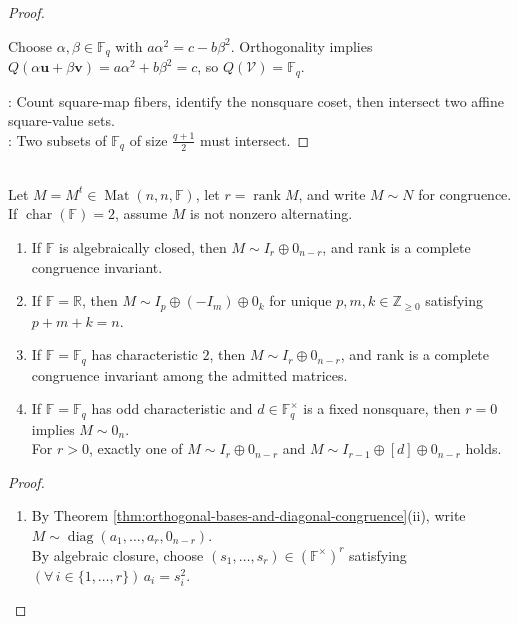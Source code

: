 \begin{proposition}
\begin{proof}
\begin{enumerate}[label=(\roman*)]
Choose $\alpha,\beta\in\mathbb{F}_q$ with $a\alpha^2=c-b\beta^2$. Orthogonality implies $Q(\alpha\mathbf{u}+\beta\mathbf{v})=a\alpha^2+b\beta^2=c$, so $Q(\mathcal{V})=\mathbb{F}_q$.
\end{enumerate}
: Count square-map fibers, identify the nonsquare coset, then intersect two affine square-value sets.\\
: Two subsets of $\mathbb{F}_q$ of size $\frac{q+1}{2}$ must intersect.
\end{proof}
\end{proposition}

\begin{theorem} \label{thm:orthogonal-canonical-forms-common-fields} \\
Let $M=M^t\in\operatorname{Mat}(n,n,\mathbb{F})$, let $r=\operatorname{rank}M$, and write $M\sim N$ for congruence. If $\operatorname{char}(\mathbb{F})=2$, assume $M$ is not nonzero alternating.
\begin{enumerate}[label=(\roman*)]
\setlength{\itemsep}{0pt}
\item If $\mathbb{F}$ is algebraically closed, then $M\sim I_r\oplus0_{n-r}$, and rank is a complete congruence invariant.
\item If $\mathbb{F}=\mathbb{R}$, then $M\sim I_p\oplus(-I_m)\oplus0_k$ for unique $p,m,k\in\mathbb{Z}_{\geq0}$ satisfying $p+m+k=n$.
\item If $\mathbb{F}=\mathbb{F}_q$ has characteristic $2$, then $M\sim I_r\oplus0_{n-r}$, and rank is a complete congruence invariant among the admitted matrices.
\item If $\mathbb{F}=\mathbb{F}_q$ has odd characteristic and $d\in\mathbb{F}_q^{\times}$ is a fixed nonsquare, then $r=0$ implies $M\sim0_n$.\\
For $r>0$, exactly one of $M\sim I_r\oplus0_{n-r}$ and $M\sim I_{r-1}\oplus[d]\oplus0_{n-r}$ holds.
\end{enumerate}
\begin{proof}
\begin{enumerate}[label=(\roman*)]
\setlength{\itemsep}{0pt}
\item By Theorem \ref{thm:orthogonal-bases-and-diagonal-congruence}(ii), write $M\sim\operatorname{diag}(a_1,\ldots,a_r,0_{n-r})$.\\
By algebraic closure, choose $(s_1,\ldots,s_r)\in(\mathbb{F}^{\times})^r$ satisfying $(\forall\,i\in\{1,\ldots,r\})\,a_i=s_i^2$.\\

\end{enumerate}
\end{proof}
\end{theorem}
